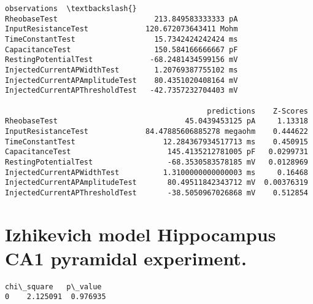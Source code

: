             \begin{tcolorbox}[breakable, size=fbox, boxrule=.5pt, pad at break*=1mm, opacityfill=0]
\begin{Verbatim}[commandchars=\\\{\}]
                                         observations  \textbackslash{}
RheobaseTest                      213.849583333333 pA
InputResistanceTest             120.672073643411 Mohm
TimeConstantTest                  15.7342424242424 ms
CapacitanceTest                   150.584166666667 pF
RestingPotentialTest             -68.2481434599156 mV
InjectedCurrentAPWidthTest        1.20769387755102 ms
InjectedCurrentAPAmplitudeTest    80.4351020408164 mV
InjectedCurrentAPThresholdTest   -42.7357232704403 mV

                                              predictions    Z-Scores
RheobaseTest                             45.0439453125 pA     1.13318
InputResistanceTest             84.47885606885278 megaohm    0.444622
TimeConstantTest                    12.284367934517713 ms    0.450915
CapacitanceTest                      145.4135212781005 pF   0.0299731
RestingPotentialTest                 -68.3530583578185 mV   0.0128969
InjectedCurrentAPWidthTest          1.3100000000000003 ms     0.16468
InjectedCurrentAPAmplitudeTest       80.49511842343712 mV  0.00376319
InjectedCurrentAPThresholdTest       -38.5050967026868 mV    0.512854
\end{Verbatim}
\end{tcolorbox}
        
    \hypertarget{izhikevich-model-hippocampus-ca1-pyramidal-experiment.}{%
\section{Izhikevich model Hippocampus CA1 pyramidal
experiment.}\label{izhikevich-model-hippocampus-ca1-pyramidal-experiment.}}

            \begin{tcolorbox}[breakable, size=fbox, boxrule=.5pt, pad at break*=1mm, opacityfill=0]
\begin{Verbatim}[commandchars=\\\{\}]
   chi\_square   p\_value
0    2.125091  0.976935
\end{Verbatim}
\end{tcolorbox}
        
